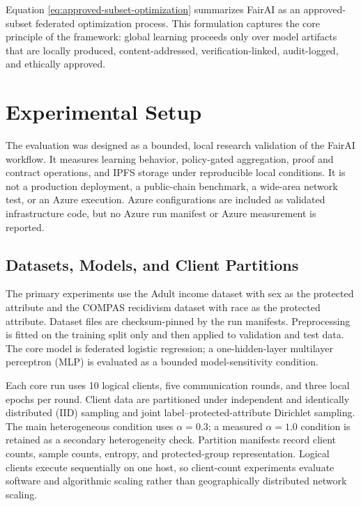 \documentclass[futureinternet,article,submit,pdftex,moreauthors]{Definitions/mdpi}
\begin{document}
Equation \eqref{eq:approved-subset-optimization} summarizes FairAI as an approved-subset federated optimization process. This formulation captures the core principle of the framework: global learning proceeds only over model artifacts that are locally produced, content-addressed, verification-linked, audit-logged, and ethically approved.

\section{Experimental Setup}
\label{sec:experimental-setup}

The evaluation was designed as a bounded, local research validation of the FairAI workflow. It measures learning behavior, policy-gated aggregation, proof and contract operations, and IPFS storage under reproducible local conditions. It is not a production deployment, a public-chain benchmark, a wide-area network test, or an Azure execution. Azure configurations are included as validated infrastructure code, but no Azure run manifest or Azure measurement is reported.

\subsection{Datasets, Models, and Client Partitions}

The primary experiments use the Adult income dataset with sex as the protected attribute and the COMPAS recidivism dataset with race as the protected attribute. Dataset files are checksum-pinned by the run manifests. Preprocessing is fitted on the training split only and then applied to validation and test data. The core model is federated logistic regression; a one-hidden-layer multilayer perceptron (MLP) is evaluated as a bounded model-sensitivity condition.

Each core run uses 10 logical clients, five communication rounds, and three local epochs per round. Client data are partitioned under independent and identically distributed (IID) sampling and joint label--protected-attribute Dirichlet sampling. The main heterogeneous condition uses \(\alpha=0.3\); a measured \(\alpha=1.0\) condition is retained as a secondary heterogeneity check. Partition manifests record client counts, sample counts, entropy, and protected-group representation. Logical clients execute sequentially on one host, so client-count experiments evaluate software and algorithmic scaling rather than geographically distributed network scaling.
\end{document}
